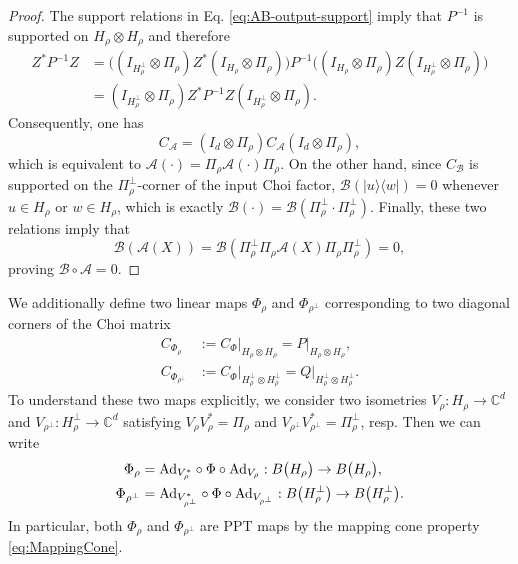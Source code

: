 \documentclass[11pt,reqno]{amsart}
\theoremstyle{definition}
\theoremstyle{definition}
\theoremstyle{definition}
\theoremstyle{definition}
\newcommand{\la}{\langle}
\newcommand{\ra}{\rangle}
\newcommand{\A}{\mathcal{A}}
\newcommand{\B}{\mathcal{B}}
\newcommand{\Comp}{\mathbb{C}}
\newcommand{\Ad}{{\rm Ad}}
\begin{document}
\begin{proof}
The support relations in Eq. \eqref{eq:AB-output-support} imply that $P^{-1}$ is supported on
$H_{\rho}\otimes H_{\rho}$ and therefore
\begin{align*}
    Z^*P^{-1}Z &= \big((I_{H_{\rho}^{\perp}}\otimes \Pi_{\rho})Z^*(I_{H_{\rho}}\otimes \Pi_{\rho})\big)P^{-1}\big((I_{H_{\rho}}\otimes \Pi_{\rho})Z(I_{H_{\rho}^{\perp}}\otimes \Pi_{\rho})\big) \\
    &= (I_{H_{\rho}^{\perp}}\otimes \Pi_{\rho})Z^*P^{-1}Z(I_{H_{\rho}^{\perp}}\otimes \Pi_{\rho}).
\end{align*}
Consequently, one has
\begin{equation} \label{eq:Asupport}
    C_{\mathcal{A}} =(I_d\otimes \Pi_{\rho})C_{\mathcal{A}}(I_d\otimes \Pi_{\rho}),
\end{equation}
which is equivalent to $\mathcal{A}(\cdot) =\Pi_{\rho}\A(\cdot)\Pi_{\rho}$. On the other hand, since $C_{\B}$ is supported on the
$\Pi_{\rho}^{\perp}$-corner of the input Choi factor, 
$\B(|u\ra\la w|)=0$ whenever $u\in H_{\rho}$ or $w\in H_{\rho}$, which is exactly $\mathcal{B}(\cdot)=\B(\Pi_{\rho}^{\perp}\cdot \Pi_{\rho}^{\perp})$.  Finally, these two relations imply that
$$
 \B(\A(X))
 =\B(\Pi_{\rho}^{\perp}\Pi_{\rho}\A(X)\Pi_{\rho}\Pi_{\rho}^{\perp})=0,
$$
proving $\B\circ \A = 0$.
\end{proof}

We additionally define two linear maps $\Phi_{\rho}$ and $\Phi_{\rho^{\perp}}$ corresponding to two diagonal corners of the Choi matrix
\begin{align*}
    C_{\Phi_{\rho}}&:=C_{\Phi}\big|_{H_{\rho}\otimes H_{\rho}} = P\big|_{H_{\rho}\otimes H_{\rho}},\\
    C_{\Phi_{\rho^{\perp}}}&:=C_{\Phi}\big|_{H_{\rho}^{\perp}\otimes H_{\rho}^{\perp}} = Q\big|_{H_{\rho}^{\perp}\otimes H_{\rho}^{\perp}}.
\end{align*}
To understand these two maps explicitly, we consider two isometries $V_{\rho}:H_{\rho}\to \Comp^d$ and $V_{\rho^{\perp}}:H_{\rho}^{\perp}\to \Comp^d$ satisfying
$V_{\rho}V_{\rho}^*=\Pi_{\rho}$ and $V_{\rho^{\perp}}V_{\rho^{\perp}}^*=\Pi_{\rho}^{\perp}$, resp. Then we can write
\begin{equation} \label{eq:PPTCorner}
\begin{split}
    \Phi_{\rho} &=\Ad_{V_{\rho}^*}\circ\Phi\circ\Ad_{V_{\rho}}:B\big(H_{\rho}\big)\to B\big(H_{\rho}\big),\\
     \Phi_{\rho^{\perp}}&=\Ad_{V_{\rho^{\perp}}^*}\circ\Phi\circ\Ad_{V_{\rho^{\perp}}}:B\big(H_{\rho}^{\perp}\big)\to B\big(H_{\rho}^{\perp}\big).
\end{split}
\end{equation}
In particular, both $\Phi_{\rho}$ and $\Phi_{\rho^{\perp}}$ are PPT maps by the mapping cone property \eqref{eq:MappingCone}. 
\end{document}
